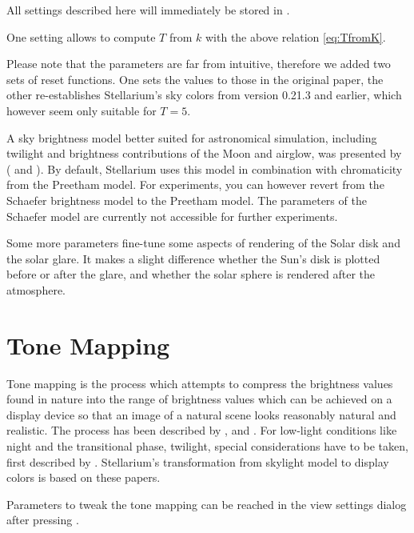 All settings described here will immediately be stored in . 

One setting allows to compute $T$ from $k$ with the above relation
\ref{eq:TfromK}.

Please note that the parameters are far from intuitive, therefore we
added two sets of reset functions. One sets the values to those in the
original paper, the other re-establishes Stellarium's sky colors from
version 0.21.3 and earlier, which however seem only suitable for
$T=5$.

A sky brightness model better suited for astronomical simulation,
including twilight and brightness contributions of the Moon and
airglow, was presented by \citeauthor{Schaefer:Limits-Archaeo}
(\citeyear{Schaefer:Limits-Archaeo} and
\citeyear{Schaefer:Limits}). By default, Stellarium uses this model in
combination with chromaticity from the Preetham model. For
experiments, you can however revert from the Schaefer brightness model
to the Preetham model. The parameters of the Schaefer model are
currently not accessible for further experiments.

Some more parameters fine-tune some aspects of rendering of the Solar
disk and the solar glare. It makes a slight difference whether the
Sun's disk is plotted before or after the glare, and whether the solar
sphere is rendered after the atmosphere. 

\section{Tone Mapping}

Tone mapping is the process which attempts to compress the brightness
values found in nature into the range of brightness values which can
be achieved on a display device so that an image of a natural scene looks reasonably natural
and realistic. The process has been described by
\citet{TumblinRushmeier:1993}, \citet{Larson:1997} and
\citet{DevlinChalmersWilkie:2002}. For low-light conditions like night
and the transitional phase, twilight, special considerations have to
be taken, first described by \citet{WannJensen:2000}.
Stellarium's transformation from skylight model to display colors is based on these papers.

Parameters to tweak the tone mapping can be reached in the view
settings dialog after pressing .

